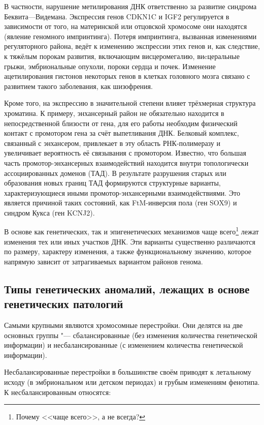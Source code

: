 \documentclass[a4paper,12pt]{article}
\begin{document}
В частности, нарушение метилирования ДНК ответственно за развитие синдрома Беквита---Видемана.
Экспрессия генов CDKN1C и IGF2 регулируется в зависимости от того, на материнской или отцовской хромосоме они находятся (явление геномного импринтинга).
Потеря импринтинга, вызванная изменениями регуляторного района, ведёт к изменению экспрессии этих генов и, как следствие, к тяжёлым порокам развития, включающим висцеромегалию, виcцеральные грыжи, эмбриональные опухоли, пороки сердца и почек\cite{Jin_2018}.
Изменение ацетилирования гистонов некоторых генов в клетках головного мозга связано с развитием такого заболевания, как шизофрения\cite{Tang_2011}.

Кроме того, на экспрессию в значительной степени влияет трёхмерная структура хроматина.
К примеру, энхансерный район не обязательно находится в непосредственной близости от гена, для его работы необходим физический контакт с промотором гена за счёт выпетливания ДНК.
Белковый комплекс, связанный с энхансером, привлекает в эту область РНК-полимеразу и увеличивает вероятность её связывания с промотором.
Известно, что большая часть промотор-энхансерных взаимодействий находится внутри топологически ассоциированных доменов (ТАД).
В результате разрушения старых или образования новых границ ТАД формируются структурные варианты, характеризующиеся иными промотор-энхансерными взаимодействиями.
Это является причиной таких состояний, как FtM-инверсия пола (ген SOX9) и синдром Кукса (ген KCNJ2)\cite{Spielmann_2018}.

В основе как генетических, так и эпигенетических механизмов чаще всего\footnote{Почему <<чаще всего>>, а не всегда?} лежат изменения тех или иных участков ДНК.
Эти варианты существенно различаются по размеру, характеру изменения, а также функциональному значению, которое напрямую зависит от затрагиваемых вариантом районов генома.

\subsection{Типы генетических аномалий, лежащих в основе генетических патологий}

Самыми крупными являются хромосомные перестройки.
Они делятся на две основных группы "--- сбалансированные (без изменения количества генетической информации) и несбалансированные (с изменением количества генетической информации).

Несбалансированные перестройки в большинстве своём приводят к летальному исходу (в эмбриональном или детском периодах) и грубым изменениям фенотипа.
К несбалансированным относятся:
\end{document}
